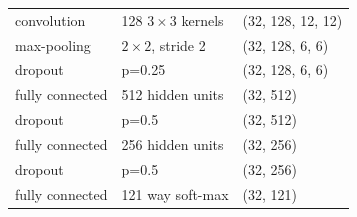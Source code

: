 \documentclass[11pt,oneside,a4paper]{article}
\numberwithin{equation}{section}
\begin{document}
\begin{table}[ht]
\begin{tabular}{lll}
convolution     & 128 $3 \times 3$ kernels  & (32, 128, 12, 12)  \\
max-pooling     & $2 \times 2$, stride 2    & (32, 128, 6, 6)    \\
dropout         & p=0.25           & (32, 128, 6, 6)    \\
fully connected & 512 hidden units & (32, 512)          \\
dropout         & p=0.5            & (32, 512)          \\
fully connected & 256 hidden units & (32, 256)          \\
dropout         & p=0.5            & (32, 256)          \\
fully connected & 121 way soft-max & (32, 121)          \\ \hline
\end{tabular}
\end{table}
\end{document}

